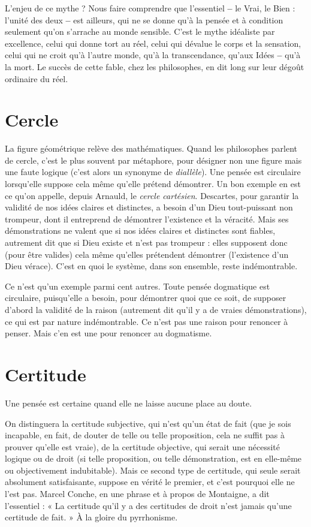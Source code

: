 L'enjeu de ce mythe ? Nous faire comprendre que l'essentiel {\bf --} le Vrai, le
Bien : l’unité des deux {\bf --} est ailleurs, qui ne se donne qu’à la pensée et à condition
seulement qu’on s’arrache au monde sensible. C’est le mythe idéaliste par
excellence, celui qui donne tort au réel, celui qui dévalue le corps et la sensation,
celui qui ne croit qu’à l’autre monde, qu’à la transcendance, qu’aux Idées
{\bf --} qu'à la mort. Le succès de cette fable, chez les philosophes, en dit long sur
leur dégoût ordinaire du réel.

\section{Cercle}
La figure géométrique relève des mathématiques. Quand les philosophes
parlent de cercle, c’est le plus souvent par métaphore,
pour désigner non une figure mais une faute logique (c’est alors un synonyme
de {\it diallèle}). Une pensée est circulaire lorsqu’elle suppose cela même qu’elle prétend
démontrer. Un bon exemple en est ce qu’on appelle, depuis Arnauld, le
{\it cercle cartésien}. Descartes, pour garantir la validité de nos idées claires et distinctes,
a besoin d’un Dieu tout-puissant non trompeur, dont il entreprend de
démontrer l'existence et la véracité. Mais ses démonstrations ne valent que si
nos idées claires et distinctes sont fiables, autrement dit que si Dieu existe et
n’est pas trompeur : elles supposent donc (pour être valides) cela même qu’elles
prétendent démontrer (l'existence d’un Dieu vérace). C’est en quoi le système,
dans son ensemble, reste indémontrable.

Ce n’est qu’un exemple parmi cent autres. Toute pensée dogmatique est
circulaire, puisqu’elle a besoin, pour démontrer quoi que ce soit, de supposer
d’abord la validité de la raison (autrement dit qu’il y a de vraies démonstrations),
ce qui est par nature indémontrable. Ce n’est pas une raison pour
renoncer à penser. Mais c’en est une pour renoncer au dogmatisme.

\section{Certitude}
Une pensée est certaine quand elle ne laisse aucune place au
doute.

On distinguera la certitude subjective, qui n’est qu’un état de fait (que je
sois incapable, en fait, de douter de telle ou telle proposition, cela ne suffit pas
à prouver qu’elle est vraie), de la certitude objective, qui serait une nécessité
logique ou de droit (si telle proposition, ou telle démonstration, est en elle-même
ou objectivement indubitable). Mais ce second type de certitude, qui
seule serait absolument satisfaisante, suppose en vérité le premier, et c’est pourquoi
elle ne l’est pas. Marcel Conche, en une phrase et à propos de Montaigne,
a dit l’essentiel : « La certitude qu’il y a des certitudes de droit n’est jamais
qu’une certitude de fait. » À la gloire du pyrrhonisme.

